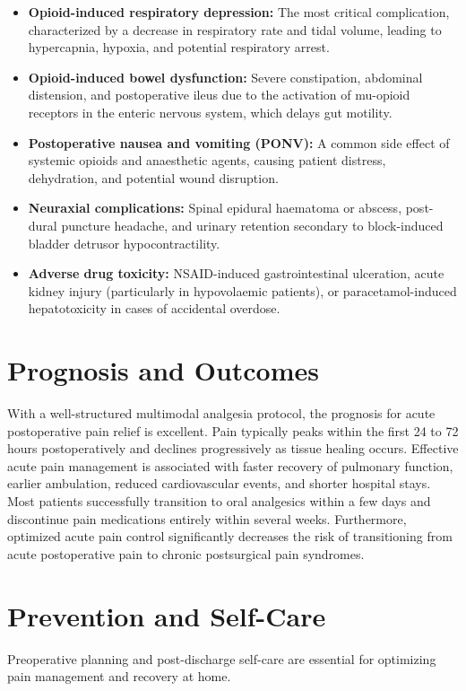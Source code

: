 \begin{itemize}
    \item \textbf{Opioid-induced respiratory depression:} The most critical complication, characterized by a decrease in respiratory rate and tidal volume, leading to hypercapnia, hypoxia, and potential respiratory arrest.
    \item \textbf{Opioid-induced bowel dysfunction:} Severe constipation, abdominal distension, and postoperative ileus due to the activation of mu-opioid receptors in the enteric nervous system, which delays gut motility.
    \item \textbf{Postoperative nausea and vomiting (PONV):} A common side effect of systemic opioids and anaesthetic agents, causing patient distress, dehydration, and potential wound disruption.
    \item \textbf{Neuraxial complications:} Spinal epidural haematoma or abscess, post-dural puncture headache, and urinary retention secondary to block-induced bladder detrusor hypocontractility.
    \item \textbf{Adverse drug toxicity:} NSAID-induced gastrointestinal ulceration, acute kidney injury (particularly in hypovolaemic patients), or paracetamol-induced hepatotoxicity in cases of accidental overdose.
\end{itemize}

\section*{Prognosis and Outcomes}
With a well-structured multimodal analgesia protocol, the prognosis for acute postoperative pain relief is excellent. Pain typically peaks within the first 24 to 72 hours postoperatively and declines progressively as tissue healing occurs. Effective acute pain management is associated with faster recovery of pulmonary function, earlier ambulation, reduced cardiovascular events, and shorter hospital stays. Most patients successfully transition to oral analgesics within a few days and discontinue pain medications entirely within several weeks. Furthermore, optimized acute pain control significantly decreases the risk of transitioning from acute postoperative pain to chronic postsurgical pain syndromes.

\section*{Prevention and Self-Care}
Preoperative planning and post-discharge self-care are essential for optimizing pain management and recovery at home.

